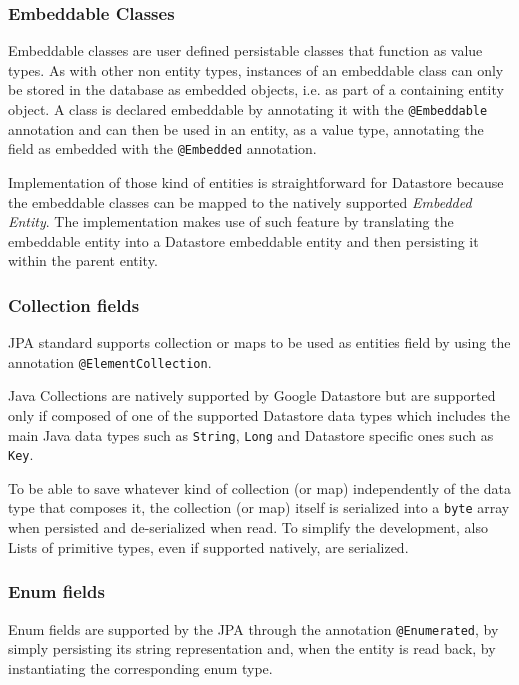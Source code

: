 \subsubsection{Embeddable Classes}
Embeddable classes are user defined persistable classes that function as value types. As with other non entity types, instances of an embeddable class can only be stored in the database as embedded objects, i.e. as part of a containing entity object.
A class is declared embeddable by annotating it with the \texttt{@Embeddable} annotation and can then be used in an entity, as a value type, annotating the field as embedded with the \texttt{@Embedded} annotation. 

\noindent Implementation of those kind of entities is straightforward for Datastore because the embeddable classes can be mapped to the natively supported \textit{Embedded Entity}.
\noindent The implementation makes use of such feature by translating the embeddable entity into a Datastore embeddable entity and then persisting it within the parent entity.

\subsubsection{Collection fields}
JPA standard supports collection or maps to be used as entities field by using the annotation \texttt{@ElementCollection}.

\newparagraph Java Collections are natively supported by Google Datastore but are supported only if composed of one of the supported Datastore data types which includes the main Java data types such as \texttt{String}, \texttt{Long} and Datastore specific ones such as \texttt{Key}.

\noindent To be able to save whatever kind of collection (or map) independently of the data type that composes it, the collection (or map) itself is serialized into a \texttt{byte} array when persisted and de-serialized when read.
\noindent To simplify the development, also Lists of primitive types, even if supported natively, are serialized.

\subsubsection{Enum fields}
Enum fields are supported by the JPA through the annotation \texttt{@Enumerated}, by simply  persisting its string representation and, when the entity is read back, by instantiating the corresponding enum type.

